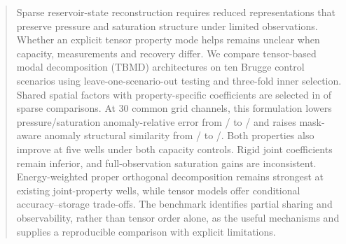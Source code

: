 \begin{abstract}
Sparse reservoir-state reconstruction requires reduced representations that preserve pressure and saturation structure under limited observations. Whether an explicit tensor property mode helps remains unclear when capacity, measurements and recovery differ. We compare tensor-based modal decomposition (TBMD) architectures on ten Brugge control scenarios using leave-one-scenario-out testing and three-fold inner selection. Shared spatial factors with property-specific coefficients are selected in \ENineSharedHeadSelections{} of \ENineSparseSelections{} sparse comparisons. At 30 common grid channels, this formulation lowers pressure/saturation anomaly-relative error from \ENineGridThirtyThreeErrorP/\ENineGridThirtyThreeErrorSo{} to \ENineGridThirtyFourErrorP/\ENineGridThirtyFourErrorSo{} and raises mask-aware anomaly structural similarity from \ENineGridThirtyThreeSsimP/\ENineGridThirtyThreeSsimSo{} to \ENineGridThirtyFourSsimP/\ENineGridThirtyFourSsimSo. Both properties also improve at five wells under both capacity controls. Rigid joint coefficients remain inferior, and full-observation saturation gains are inconsistent. Energy-weighted proper orthogonal decomposition remains strongest at existing joint-property wells, while tensor models offer conditional accuracy--storage trade-offs. The benchmark identifies partial sharing and observability, rather than tensor order alone, as the useful mechanisms and supplies a reproducible comparison with explicit limitations.
\end{abstract}
